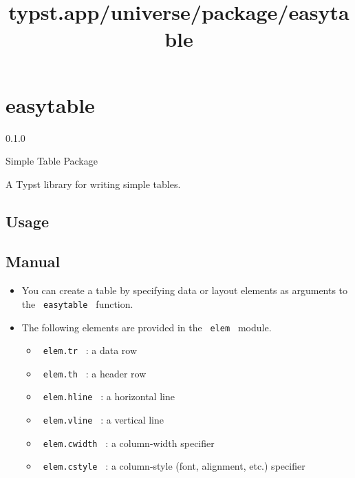 \title{typst.app/universe/package/easytable}

\label{banner}
\section{easytable}\label{easytable}

{ 0.1.0 }

Simple Table Package

\label{readme}
A Typst library for writing simple tables.

\subsection{Usage}\label{usage}

\begin{Shaded}
\begin{Highlighting}[]
\end{Highlighting}
\end{Shaded}

\subsection{Manual}\label{manual}

\begin{itemize}
\tightlist
\item
  You can create a table by specifying data or layout elements as
  arguments to the \texttt{\ easytable\ } function.
\item
  The following elements are provided in the \texttt{\ elem\ } module.

  \begin{itemize}
  \tightlist
  \item
    \texttt{\ elem.tr\ } : a data row
  \item
    \texttt{\ elem.th\ } : a header row
  \item
    \texttt{\ elem.hline\ } : a horizontal line
  \item
    \texttt{\ elem.vline\ } : a vertical line
  \item
    \texttt{\ elem.cwidth\ } : a column-width specifier
  \item
    \texttt{\ elem.cstyle\ } : a column-style (font, alignment, etc.)
    specifier
  \end{itemize}
\end{itemize}

